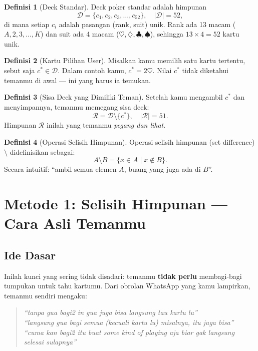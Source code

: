 \documentclass[11pt,a4paper]{article}
\theoremstyle{definition}
\newtheorem{definisi}{Definisi}[section]
\begin{document}
\begin{definisi}[Deck Standar]
Deck poker standar adalah himpunan
\[
\mathcal{D} = \{ c_1, c_2, c_3, \ldots, c_{52} \}, \quad |\mathcal{D}| = 52,
\]
di mana setiap $c_i$ adalah pasangan (rank, suit) unik. Rank ada 13 macam ($A, 2, 3, \ldots, K$) dan suit ada 4 macam ($\heartsuit, \diamondsuit, \clubsuit, \spadesuit$), sehingga $13 \times 4 = 52$ kartu unik.
\end{definisi}

\begin{definisi}[Kartu Pilihan User]
Misalkan kamu memilih satu kartu tertentu, sebut saja $c^* \in \mathcal{D}$. Dalam contoh kamu, $c^* = 2\heartsuit$. Nilai $c^*$ tidak diketahui temanmu di awal --- ini yang harus ia temukan.
\end{definisi}

\begin{definisi}[Sisa Deck yang Dimiliki Teman]
Setelah kamu mengambil $c^*$ dan menyimpannya, temanmu memegang sisa deck:
\[
\mathcal{R} = \mathcal{D} \setminus \{c^*\}, \quad |\mathcal{R}| = 51.
\]
Himpunan $\mathcal{R}$ inilah yang temanmu \emph{pegang dan lihat}.
\end{definisi}

\begin{definisi}[Operasi Selisih Himpunan]
Operasi selisih himpunan (set difference) $\setminus$ didefinisikan sebagai:
\[
A \setminus B = \{ x \in A \mid x \notin B \}.
\]
Secara intuitif: ``ambil semua elemen $A$, buang yang juga ada di $B$''.
\end{definisi}

\section{Metode 1: Selisih Himpunan --- Cara Asli Temanmu}

\subsection{Ide Dasar}

Inilah kunci yang sering tidak disadari: temanmu \textbf{tidak perlu} membagi-bagi tumpukan untuk tahu kartumu. Dari obrolan WhatsApp yang kamu lampirkan, temanmu sendiri mengaku:

\begin{quote}
\textit{``tanpa gua bagi2 in gua juga bisa langsung tau kartu lu''} \\
\textit{``langsung gua bagi semua (kecuali kartu lu) misalnya, itu juga bisa''} \\
\textit{``cuma kan bagi2 itu buat some kind of playing aja biar gak langsung selesai sulapnya''}
\end{quote}
\end{document}
